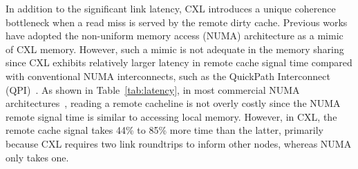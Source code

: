 In addition to the significant link latency, CXL introduces a unique coherence bottleneck when a read miss is served by the remote dirty cache. 
Previous works~\cite{ccnic_asplos24, pond} have adopted the non-uniform memory access (NUMA) architecture as a mimic of CXL memory. 
However, such a mimic is not adequate in the memory sharing since CXL exhibits relatively larger latency in remote cache signal time compared with conventional NUMA interconnects, such as the QuickPath Interconnect (QPI)~\cite{qpi-doc}. As shown in Table~\ref{tab:latency}, in most commercial NUMA architectures~\cite{directory_sp19, moesi_isca22}, reading a remote cacheline is not overly costly since the NUMA remote signal time is similar to accessing local memory. 
However, in CXL, the remote cache signal takes 44\% to 85\% more time than the latter, primarily because CXL requires two link roundtrips to inform other nodes, whereas NUMA only takes one. 







